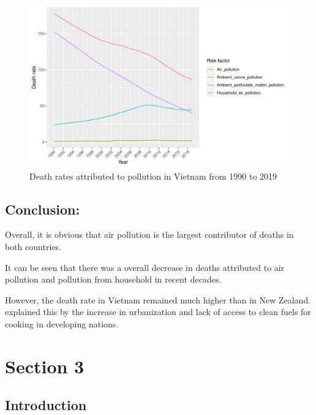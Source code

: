 \documentclass[11pt,a4paper,]{article}
\begin{document}
\begin{figure}[H]

{\centering \includegraphics{Assignment4_files/figure-latex/vnfig-1} 

}

\caption{Death rates attributed to pollution in Vietnam from 1990 to 2019}\label{fig:vnfig}
\end{figure}

\hypertarget{conclusion-1}{%
\subsection{Conclusion:}\label{conclusion-1}}

Overall, it is obvious that air pollution is the largest contributor of deaths in both countries.

It can be seen that there was a overall decrease in deaths attributed to air pollution and pollution from household in recent decades.

However, the death rate in Vietnam remained much higher than in New Zealand. \textcite{gordon2014respiratory} explained this by the increase in urbanization and lack of access to clean fuels for cooking in developing nations.

\hypertarget{section-3}{%
\section{Section 3}\label{section-3}}

\hypertarget{introduction-2}{%
\subsection{Introduction}\label{introduction-2}}
\end{document}
